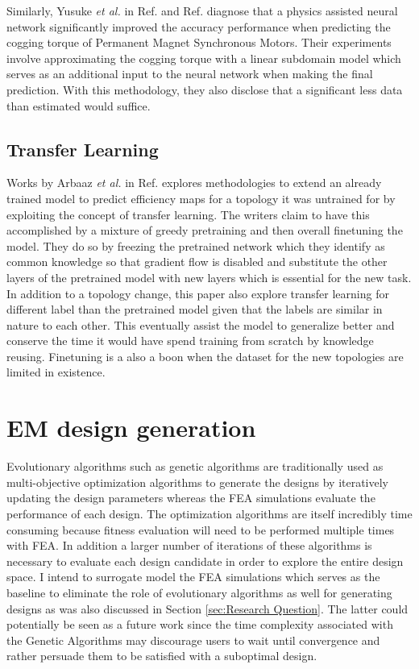 \documentclass{report} %
\begin{document}
Similarly, Yusuke \textit{et al.} in Ref. \cite{PANN-MT-2021} and Ref. \cite{PANN-MOO-2021} diagnose that a physics assisted neural network significantly improved the accuracy 
performance when predicting the cogging torque of Permanent Magnet Synchronous Motors. Their experiments involve approximating the cogging torque with a 
linear subdomain model which serves as an additional input to the neural network when making the final prediction. With this methodology, they also disclose that a 
significant less data than estimated would suffice.

\subsection{Transfer Learning}\label{subsec:LR Transfer Learning}
Works by Arbaaz \textit{et al.} in Ref. \cite{EM TL-2020} explores methodologies to extend an already trained model to predict efficiency maps for a topology it was 
untrained for by exploiting the concept of transfer learning. The writers claim to have this accomplished by a mixture of greedy pretraining and then overall finetuning 
the model. They do so by freezing the pretrained network which they identify as common knowledge so that gradient flow is disabled and substitute the other 
layers of the pretrained model with new layers which is essential for the new task.\\
In addition to a topology change, this paper also explore transfer learning for different label than the pretrained model given that the labels are similar in nature 
to each other. This eventually assist the model to generalize better and conserve the time it would have spend training from scratch by knowledge reusing. 
Finetuning is a also a boon when the dataset for the new topologies are limited in existence.\\

\section{EM design generation}\label{sec:LR EM design generation}
Evolutionary algorithms such as genetic algorithms are traditionally used as multi-objective optimization algorithms to generate the designs by iteratively
updating the design parameters whereas the \ac{FEA} simulations evaluate the performance of each design. 
The optimization algorithms are itself incredibly time consuming because fitness evaluation will need to be performed multiple times with \ac{FEA}.
In addition a larger number of iterations of these algorithms is necessary to evaluate each design candidate in order to explore the entire design space.
I intend to surrogate model the \ac{FEA} simulations which serves as the baseline to eliminate the role of evolutionary algorithms as well for generating designs as 
was also discussed in Section \ref{sec:Research Question}. The latter could potentially be seen as a future work since the time complexity associated with the 
Genetic Algorithms may discourage users to wait until convergence and rather persuade them to be satisfied with a suboptimal design.\\
\end{document}
